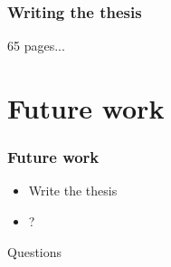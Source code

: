 \documentclass{beamer}
\begin{document}
	\begin{frame}
		\frametitle{Writing the thesis}
		65 pages...
	\end{frame}
	
	
	\section[Future work]{Future work}
	\begin{frame}
		\frametitle{Future work}
		\begin{itemize}
			\item Write the thesis
			\item ?
		\end{itemize}
	\end{frame}

	\begin{frame}[c]
		\begin{center}
		\Huge Questions
		\end{center}
	\end{frame}
\end{document}
